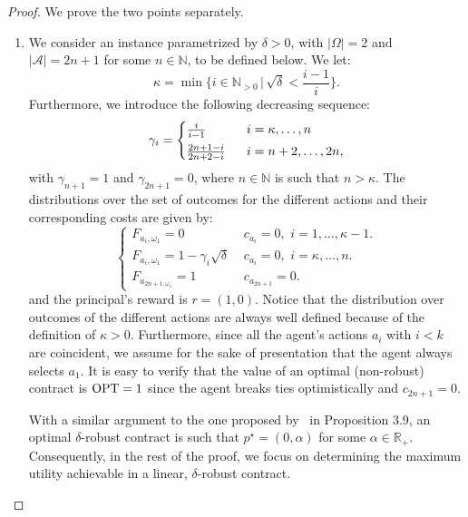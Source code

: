 \begin{proof}
	We prove the two points separately.
	\begin{enumerate}
		\item We consider an instance parametrized by $\delta > 0$, with $|\Omega| = 2$ and $|\mathcal{A}| = 2n + 1$ for some $n \in \mathbb{N}$, to be defined below. We let:
		$$\kappa  = \min \Bigg\{i\in \mathbb{N}_{>0} \, | \, \sqrt{\delta } < \frac{i- 1}{i} \Bigg\}.$$
		Furthermore, we introduce the following decreasing sequence:
		$$\gamma_i = \begin{cases}
			\vspace{1mm}
			\frac{i}{i-1} \,\,\ & i = \kappa, \dots, n \\
			\frac{2n+1-i}{2n+2-i} \,\,\ &i = n+2, \dots, 2n,\\
		\end{cases}$$
		with $\gamma_{n+1}=1$ and $\gamma_{2n+1}=0$, where $n \in \mathbb{N}$ is such that $n > \kappa$.
		The distributions over the set of outcomes for the different actions and their corresponding costs are given by:
		$$ \begin{cases}
			F_{a_i,\omega_1}=0 \,\,& c_{a_i}=0, \,\, i=1, \dots, \kappa-1.   \\
			F_{a_i,\omega_1}=1-\gamma_i \sqrt{\delta}\,\,& c_{a_i}=0, \,\, i=\kappa, \dots, n . \\
			F_{a_{2n+1,\omega_1}}=1 \,\,& c_{a_{2n+1}}=0.
		\end{cases}$$
		and the principal's reward is $r=(1,0)$.
		Notice that the distribution over outcomes of the different actions are always well defined because of the definition of $\kappa>0$.
		Furthermore, since all the agent's actions $a_i$ with $i < k$ are coincident, we assume for the sake of presentation that the agent always selects $a_1$.
		It is easy to verify that the value of an optimal (non-robust) contract is $\textnormal{OPT}=1$ since the agent breaks ties optimistically and $c_{2n+1}=0$.	
		
		With a similar argument to the one proposed by~\cite{dutting2024algorithmic} in Proposition 3.9, an optimal $\delta$-robust contract is such that $p^\star = (0, \alpha)$ for some $\alpha \in \mathbb{R}_{+}$.
		Consequently, in the rest of the proof, we focus on determining the maximum utility achievable in a linear, $\delta$-robust contract. 
		

\end{enumerate}
\end{proof}
